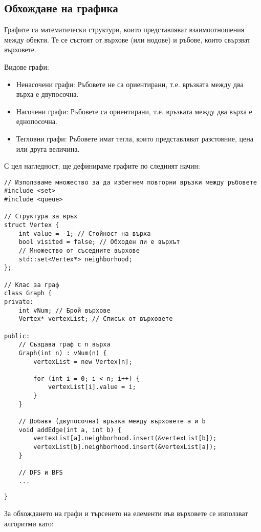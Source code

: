 \documentclass[oneside]{book}
\begin{document}
\subsection{Обхождане на графика}
Графите са математически структури, които представляват взаимоотношения между обекти. Те се състоят от върхове (или нодове) и ръбове, които свързват върховете.

Видове графи:
\begin{itemize}
    \item[] Ненасочени графи: Ръбовете не са ориентирани, т.е. връзката между два върха е двупосочна.
    \item[] Насочени графи: Ръбовете са ориентирани, т.е. връзката между два върха е еднопосочна.
    \item[] Тегловни графи: Ръбовете имат тегла, които представляват разстояние, цена или друга величина.
\end{itemize}

С цел нагледност, ще дефинираме графите по следният начин:
\begin{mdframed}\begin{lstlisting}
// Използваме множество за да избегнем повторни връзки между ръбовете
#include <set>
#include <queue>

// Структура за връх
struct Vertex {
    int value = -1; // Стойност на върха
    bool visited = false; // Обходен ли е върхът
    // Множество от съседните върхове
    std::set<Vertex*> neighborhood; 
};

// Клас за граф
class Graph {
private:
    int vNum; // Брой върхове
    Vertex* vertexList; // Списък от върховете

public:
    // Създава граф с n върха
    Graph(int n) : vNum(n) {
        vertexList = new Vertex[n];

        for (int i = 0; i < n; i++) {
            vertexList[i].value = i;
        }
    }

    // Добавя (двупосочна) връзка между върховете a и b
    void addEdge(int a, int b) {
        vertexList[a].neighborhood.insert(&vertexList[b]);
        vertexList[b].neighborhood.insert(&vertexList[a]);
    }

    // DFS и BFS
    ...
\end{lstlisting}\begin{lstlisting}[firstnumber=92]
}
\end{lstlisting}\end{mdframed}

За обхождането на графи и търсенето на елементи във върховете се използват алгоритми като:
\end{document}

